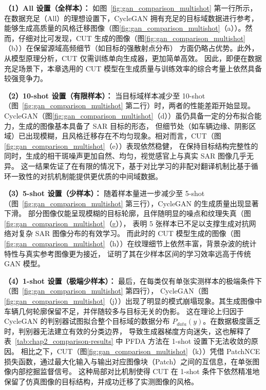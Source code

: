 \textbf{（1）All 设置（全样本）：}
如图~\ref{fig:gan_comparison_multishot} 第一行所示，在数据充足（All）的理想设置下，CycleGAN 拥有充足的目标域数据进行参考，
能够生成高质量的风格迁移图像（图\ref{fig:gan_comparison_multishot}（a））。然而，仔细对比可发现，CUT 生成的图像（图\ref{fig:gan_comparison_multishot}（b））在保留源域高频细节（如目标的强散射点分布）
方面仍略占优势。此外，从模型原理分析，CUT 仅需训练单向生成器，更加简单高效。
因此，即便在数据充足场景下，本章选用的 CUT 模型在生成质量与训练效率的综合考量上依然具备较强竞争力。

\textbf{（2）10-shot 设置（有限样本）：}  
当目标域样本减少至 10-shot（图~\ref{fig:gan_comparison_multishot} 第二行）时，两者的性能差距开始显现。
CycleGAN（图\ref{fig:gan_comparison_multishot}（d））虽仍具备一定的分布拟合能力，生成的图像基本具备了 SAR 目标的形态，
但细节处（如车辆边缘、阴影区域）已出现模糊，且风格迁移存在不均匀现象。相对而言，CUT（图\ref{fig:gan_comparison_multishot}（e））表现依然稳健，
在保持目标结构完整性的同时，生成的相干斑噪声更加自然、均匀，视觉感官上与真实 SAR 图像几乎无异。
这一结果佐证了在有限的情况下，基于对比学习的非配对翻译机制比基于循环一致性的对抗机制能提供更优质的中间域数据。

\textbf{（3）5-shot 设置（少样本）：}
随着样本量进一步减少至 5-shot（图~\ref{fig:gan_comparison_multishot} 第三行），CycleGAN 的生成质量出现显著下滑。
部分图像仅能呈现模糊的目标轮廓，且伴随明显的噪点和纹理失真（图\ref{fig:gan_comparison_multishot}（g）），
表明 5 张样本已不足以支撑生成对抗网络对复杂 SAR 图像分布的有效学习。
而此时的 CUT 模型生成的图像（图\ref{fig:gan_comparison_multishot}（h））在纹理细节上依然丰富，背景杂波的统计特性与真实参考图像更为接近，
证明了其在少样本区间的学习效率远高于传统 GAN 模型。

\textbf{（4）1-shot 设置（极端少样本）：}
最后，在每类仅有单张实测样本的极端条件下（图~\ref{fig:gan_comparison_multishot} 第四行），
CycleGAN（图\ref{fig:gan_comparison_multishot}（j））出现了明显的模式崩塌现象。其生成图像中车辆几何轮廓保留不足，并伴随较多与目标无关的伪影。
这在理论上归因于 CycleGAN 的判别器试图拟合整个目标域的数据分布 $P_{data}(y)$。在数据极度匮乏时，判别器无法建立有效的分类边界，
导致生成器梯度方向迷失，这也解释了表~\ref{tab:chap2_comparison-results} 中 PFDA 方法在 1-shot 设置下无法收敛的原因。
相比之下，CUT（图\ref{fig:gan_comparison_multishot}（k））凭借 PatchNCE 损失函数，通过最大化输入与输出对应图像块（Patch）之间的互信息，在单张图像内部挖掘监督信号。
这种局部对比机制使得 CUT 在 1-shot 条件下依然精准地保留了仿真图像的目标结构，并成功迁移了实测图像的风格。


